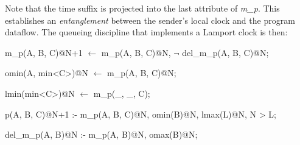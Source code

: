Note that the time suffix is projected into the last attribute of \emph{m\_p}.  This establishes an \emph{entanglement} between
the sender's local clock and the program dataflow.  The queueing discipline that implements a
Lamport clock is then:

\begin{Dedalus}

m\_p(A, B, C)@N+1 \(\leftarrow\)
  m\_p(A, B, C)@N,
  \(\lnot\) del\_m\_p(A, B, C)@N;

omin(A, min<C>)@N \(\leftarrow\)
  m\_p(A, B, C)@N;

lmin(min<C>)@N \(\leftarrow\)
  m\_p(_, _, C);

p(A, B, C)@N+1 :-
  m\_p(A, B, C)@N,
  omin(B)@N,
  lmax(L)@N,
  N > L;

del\_m\_p(A, B)@N :-
  m\_p(A, B)@N,
  omax(B)@N;
  
\end{Dedalus}

